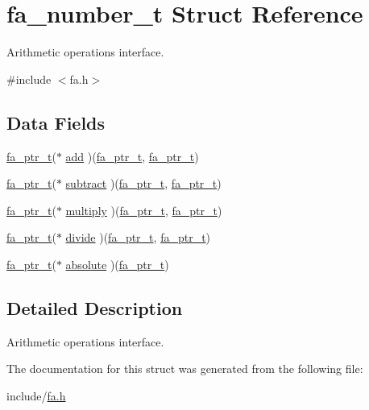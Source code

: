 \hypertarget{structfa__number__t}{\section{fa\-\_\-number\-\_\-t Struct Reference}
\label{structfa__number__t}
}


Arithmetic operations interface.  




{\ttfamily \#include $<$fa.\-h$>$}

\subsection*{Data Fields}
\begin{DoxyCompactItemize}
\item 
\hyperlink{group___fa_ga915ddeae99ad7568b273d2b876425197}{fa\-\_\-ptr\-\_\-t}($\ast$ \hyperlink{structfa__number__t_aebcc5f33c227cbc03d7c48b1df71c890}{add} )(\hyperlink{group___fa_ga915ddeae99ad7568b273d2b876425197}{fa\-\_\-ptr\-\_\-t}, \hyperlink{group___fa_ga915ddeae99ad7568b273d2b876425197}{fa\-\_\-ptr\-\_\-t})
\item 
\hyperlink{group___fa_ga915ddeae99ad7568b273d2b876425197}{fa\-\_\-ptr\-\_\-t}($\ast$ \hyperlink{structfa__number__t_aa37935099b0b301a76bc7527061c1360}{subtract} )(\hyperlink{group___fa_ga915ddeae99ad7568b273d2b876425197}{fa\-\_\-ptr\-\_\-t}, \hyperlink{group___fa_ga915ddeae99ad7568b273d2b876425197}{fa\-\_\-ptr\-\_\-t})
\item 
\hyperlink{group___fa_ga915ddeae99ad7568b273d2b876425197}{fa\-\_\-ptr\-\_\-t}($\ast$ \hyperlink{structfa__number__t_ad0fa04f044743e635044560c30b3870b}{multiply} )(\hyperlink{group___fa_ga915ddeae99ad7568b273d2b876425197}{fa\-\_\-ptr\-\_\-t}, \hyperlink{group___fa_ga915ddeae99ad7568b273d2b876425197}{fa\-\_\-ptr\-\_\-t})
\item 
\hyperlink{group___fa_ga915ddeae99ad7568b273d2b876425197}{fa\-\_\-ptr\-\_\-t}($\ast$ \hyperlink{structfa__number__t_a1d095b7a0cf27940e2435b199104ecc8}{divide} )(\hyperlink{group___fa_ga915ddeae99ad7568b273d2b876425197}{fa\-\_\-ptr\-\_\-t}, \hyperlink{group___fa_ga915ddeae99ad7568b273d2b876425197}{fa\-\_\-ptr\-\_\-t})
\item 
\hyperlink{group___fa_ga915ddeae99ad7568b273d2b876425197}{fa\-\_\-ptr\-\_\-t}($\ast$ \hyperlink{structfa__number__t_afed8c9d531c418a5e6a1d56c66ce115c}{absolute} )(\hyperlink{group___fa_ga915ddeae99ad7568b273d2b876425197}{fa\-\_\-ptr\-\_\-t})
\end{DoxyCompactItemize}


\subsection{Detailed Description}
Arithmetic operations interface. 

The documentation for this struct was generated from the following file\-:\begin{DoxyCompactItemize}
\item 
include/\hyperlink{fa_8h}{fa.\-h}\end{DoxyCompactItemize}
